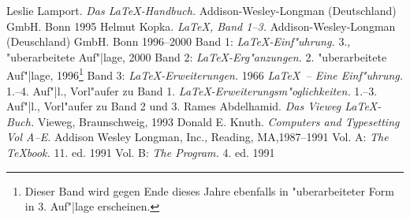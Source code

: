 \begin{thebibliography}{\hspace{1.5cm}}
 Leslie Lamport. \textsl{Das \LaTeX-Handbuch.}
    Addison-Wesley-Longman (Deutschland) GmbH. Bonn 1995
 Helmut Kopka. \textsl{\LaTeX, Band 1--3.} 
    Addison-Wesley-Longman (Deuschland) GmbH. Bonn 1996--2000
 Band 1: \textsl{\LaTeX-Einf"uhrung.} 3., "uberarbeitete
    Auf"|lage, 2000
 Band 2: \textsl{\LaTeX-Erg"anzungen.} 2. "uberarbeitete
    Auf"|lage, 1996\footnote{Dieser Band wird gegen Ende dieses Jahre ebenfalls
    in "uberarbeiteter Form in 3. Auf"|lage erscheinen.}
 Band 3: \textsl{\LaTeX-Erweiterungen.} 1966
 \textsl{\LaTeX\ -- Eine Einf"uhrung.} 1.--4. Auf"|l.,
    Vorl"aufer zu Band 1.
 \textsl{\LaTeX-Erweiterungsm"oglichkeiten.} 
    1.--3. Auf"|l., Vorl"aufer zu Band 2 und 3.
 Rames Abdelhamid. \textsl{Das Vieweg \LaTeX-Buch.}
    Vieweg, Braunschweig, 1993
 Donald E. Knuth. \textsl{Computers and Typesetting
    Vol A--E.} Addison Wesley Longman, Inc., Reading, MA,1987--1991
 Vol. A: \textsl{The \TeX book.} 11. ed. 1991
 Vol. B: \textsl{The Program.} 4. ed. 1991
\end{thebibliography}
